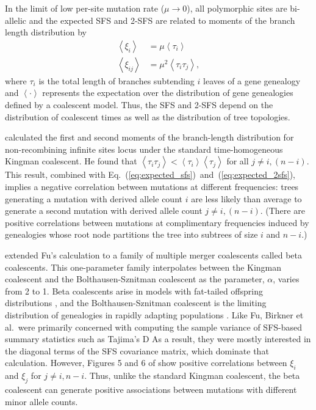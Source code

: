\documentclass[11pt, letterpaper]{article}   	%
\newcommand{\E}[1]{\left< #1 \right>}
\newcommand{\eqs}[2]{Eq.~(\ref{#1})~and~(\ref{#2})}
\begin{document}
In the limit of low per-site mutation rate ($\mu\to0$), all polymorphic sites are bi-allelic and the expected SFS and 2-SFS are related to moments of the branch length distribution by
\begin{align}
    \E{\xi_i} &= \mu \E{\tau_i} \label{eq:expected_sfs} \\
    \E{\xi_{ij}} &= \mu^2 \E{\tau_i \tau_j},
    \label{eq:expected_2sfs}
\end{align}
where $\tau_i$ is the total length of branches subtending $i$ leaves of a gene genealogy and $\E{\cdot}$ represents the expectation over the distribution of gene genealogies defined by a coalescent model.
Thus, the SFS and 2-SFS depend on the distribution of coalescent times as well as the distribution of tree topologies.

\cite{Fu1995} calculated the first and second moments of the branch-length distribution for non-recombining infinite sites locus under the standard time-homogeneous Kingman coalescent.
He found that $\E{\tau_i \tau_j} < \E{\tau_i}\E{\tau_j}$ for all $j \neq i, (n-i)$.
This result, combined with \eqs{eq:expected_sfs}{eq:expected_2sfs}, implies a negative correlation between mutations at different frequencies: trees generating a mutation with derived allele count $i$ are less likely than average to generate a second mutation with derived allele count $j \neq i, (n-i)$.
(There are positive correlations between mutations at complimentary frequencies induced by genealogies whose root node partitions the tree into subtrees of size $i$ and $n-i$.)

\cite{BirknerEtAl2013} extended Fu's calculation to a family of multiple merger coalescents called beta coalescents.
This one-parameter family interpolates between the Kingman coalescent and the Bolthausen-Sznitman coalescent as the parameter, $\alpha$, varies from 2 to 1.
Beta coalescents arise in models with fat-tailed offspring distributions \autocite{Schweinsberg2003}, and the Bolthausen-Sznitman coalescent is the limiting distribution of genealogies in rapidly adapting populations \autocite{NeherHallatscheck2013}.
Like Fu, Birkner et al.\ were primarily concerned with computing the sample variance of SFS-based summary statistics such as Tajima's D \autocite{Tajima1989}
As a result, they were mostly interested in the diagonal terms of the SFS covariance matrix, which dominate that calculation.
However, Figures 5 and 6 of \cite{BirknerEtAl2013} show positive correlations between $\xi_i$ and $\xi_j$ for $j \neq i, n-i$.
Thus, unlike the standard Kingman coalescent, the beta coalescent can generate positive associations between mutations with different minor allele counts.
\end{document}
